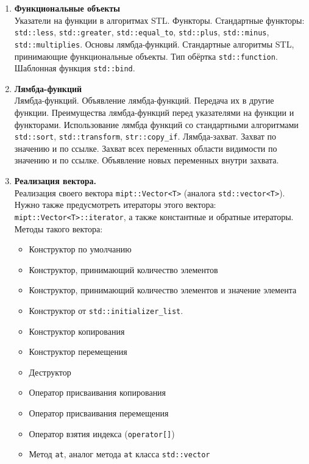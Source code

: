 \documentclass{article}
\begin{document}
\begin{enumerate}

\item \textbf{Функциональные объекты}\\
Указатели на функции в алгоритмах STL. Функторы. Стандартные функторы: \texttt{std::less}, \texttt{std::greater}, \texttt{std::equal\_to}, \texttt{std::plus}, \texttt{std::minus}, \texttt{std::multiplies}. Основы лямбда-функций. Стандартные алгоритмы STL, принимающие функциональные объекты. Тип обёртка \texttt{std::function}. Шаблонная функция \texttt{std::bind}.

\item \textbf{Лямбда-функций}\\
Лямбда-функций. Объявление лямбда-функций. Передача их в другие функции. Преимущества лямбда-функций перед указателями на функции и функторами. Использование лямбда функций со стандартными алгоритмами \texttt{std::sort}, \texttt{std::transform}, \texttt{str::copy\_if}. Лямбда-захват. Захват по значению и по ссылке. Захват всех переменных области видимости по значению и по ссылке. Объявление новых переменных внутри захвата.







\item \textbf{Реализация вектора.}\\
Реализация своего вектора \texttt{mipt::Vector<T>} (аналога \texttt{std::vector<T>}). Нужно также предусмотреть итераторы этого вектора: \texttt{mipt::Vector<T>::iterator}, а также константные и обратные итераторы.\\
Методы такого вектора:
\begin{itemize}
\item Конструктор по умолчанию
\item Конструктор, принимающий количество элементов
\item Конструктор, принимающий количество элементов и значение элемента
\item Конструктор от \texttt{std::initializer\_list}.
\item Конструктор копирования
\item Конструктор перемещения
\item Деструктор
\item Оператор присваивания копирования
\item Оператор присваивания перемещения
\item Оператор взятия индекса (\texttt{operator[]})
\item Метод \texttt{at}, аналог метода \texttt{at} класса \texttt{std::vector}


\end{itemize}
\end{enumerate}
\end{document}
